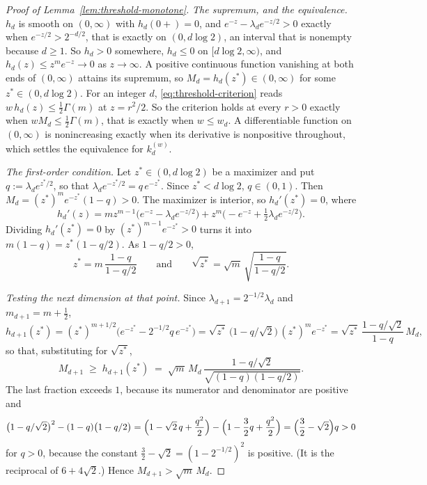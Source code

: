 \begin{proof}[Proof of Lemma~\ref{lem:threshold-monotone}]
\emph{The supremum, and the equivalence.} $h_d$ is smooth on $(0,\infty)$ with $h_d(0{+}) = 0$,
and $e^{-z} - \lambda_d e^{-z/2} > 0$ exactly when $e^{-z/2} > 2^{-d/2}$, that is exactly on
$(0, d\log 2)$, an interval that is nonempty because $d \ge 1$. So $h_d > 0$ somewhere,
$h_d \le 0$ on $[d\log 2,\infty)$, and $h_d(z) \le z^me^{-z} \to 0$ as $z \to \infty$. A positive
continuous function vanishing at both ends of $(0,\infty)$ attains its supremum, so
$M_d = h_d(z^*) \in (0,\infty)$ for some $z^* \in (0, d\log 2)$. For an integer $d$,
\ref{eq:threshold-criterion} reads $w\,h_d(z) \le \tfrac12\Gamma(m)$ at $z = r^2/2$. So the
criterion holds at every $r > 0$ exactly when $w M_d \le \tfrac12\Gamma(m)$, that is exactly when
$w \le w_d$. A differentiable function on $(0,\infty)$ is nonincreasing exactly when its
derivative is nonpositive throughout, which settles the equivalence for $k^{(w)}_d$.

\emph{The first-order condition.} Let $z^* \in (0,d\log 2)$ be a maximizer and put
$q := \lambda_d e^{z^*/2}$, so that $\lambda_d e^{-z^*/2} = q\,e^{-z^*}$. Since $z^* < d\log 2$,
$q \in (0,1)$. Then $M_d = (z^*)^m e^{-z^*}(1-q) > 0$. The maximizer is interior, so
$h_d'(z^*) = 0$, where
\[
  h_d'(z) = m z^{m-1}\bigl(e^{-z} - \lambda_d e^{-z/2}\bigr)
    + z^m\bigl(-e^{-z} + \tfrac12\lambda_d e^{-z/2}\bigr) .
\]
Dividing $h_d'(z^*) = 0$ by $(z^*)^{m-1}e^{-z^*} > 0$ turns it into $m(1-q) = z^*(1 - q/2)$. As
$1 - q/2 > 0$,
\[
  z^* = m\,\frac{1-q}{1-q/2} \qquad\text{and}\qquad
  \sqrt{z^*} = \sqrt{m}\,\sqrt{\frac{1-q}{1-q/2}} .
\]

\emph{Testing the next dimension at that point.} Since
$\lambda_{d+1} = 2^{-1/2}\lambda_d$ and $m_{d+1} = m + \tfrac12$,
\[
  h_{d+1}(z^*) = (z^*)^{m+1/2}\bigl(e^{-z^*} - 2^{-1/2}q\,e^{-z^*}\bigr)
   = \sqrt{z^*}\,\bigl(1 - q/\sqrt2\bigr)\,(z^*)^m e^{-z^*}
   = \sqrt{z^*}\,\frac{1 - q/\sqrt2}{1-q}\,M_d ,
\]
so that, substituting for $\sqrt{z^*}$,
\[
  M_{d+1} \;\ge\; h_{d+1}(z^*)
   \;=\; \sqrt{m}\,M_d\,\frac{1 - q/\sqrt2}{\sqrt{(1-q)(1-q/2)}} .
\]
The last fraction exceeds $1$, because its numerator and denominator are positive and
\[
  \bigl(1 - q/\sqrt2\bigr)^2 - (1-q)\bigl(1-q/2\bigr)
   = \Bigl(1 - \sqrt2\,q + \frac{q^2}{2}\Bigr)
     - \Bigl(1 - \frac32 q + \frac{q^2}{2}\Bigr)
   = \Bigl(\frac32 - \sqrt2\Bigr)q > 0
\]
for $q > 0$, because the constant $\tfrac32 - \sqrt2 = (1 - 2^{-1/2})^2$ is positive. (It is
the reciprocal of $6 + 4\sqrt2$.) Hence $M_{d+1} > \sqrt{m}\,M_d$.


\end{proof}
